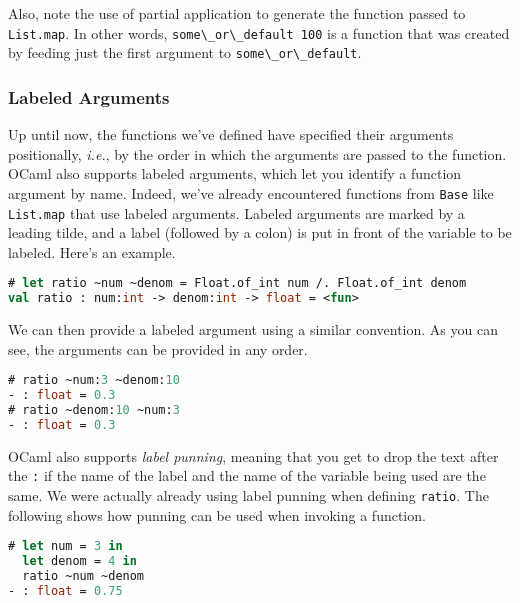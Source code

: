 Also, note the use of partial application to generate the function
passed to \passthrough{\lstinline!List.map!}. In other words,
\passthrough{\lstinline!some\_or\_default 100!} is a function that was
created by feeding just the first argument to
\passthrough{\lstinline!some\_or\_default!}.

\hypertarget{labeled-arguments}{%
\subsubsection{Labeled Arguments}\label{labeled-arguments}}

Up until now, the functions we've defined have specified their arguments
positionally, \emph{i.e.}, by the order in which the arguments are
passed to the function. OCaml also supports labeled arguments, which let
you identify a function argument by name. Indeed, we've already
encountered functions from \passthrough{\lstinline!Base!} like
\passthrough{\lstinline!List.map!} that use labeled arguments. Labeled
arguments are marked by a leading tilde, and a label (followed by a
colon) is put in front of the variable to be labeled. Here's an
example.

\begin{lstlisting}[language=Caml]
# let ratio ~num ~denom = Float.of_int num /. Float.of_int denom
val ratio : num:int -> denom:int -> float = <fun>
\end{lstlisting}

We can then provide a labeled argument using a similar convention. As
you can see, the arguments can be provided in any order.

\begin{lstlisting}[language=Caml]
# ratio ~num:3 ~denom:10
- : float = 0.3
# ratio ~denom:10 ~num:3
- : float = 0.3
\end{lstlisting}

OCaml also supports \emph{label punning}, meaning that you get to drop
the text after the \passthrough{\lstinline!:!} if the name of the label
and the name of the variable being used are the same. We were actually
already using label punning when defining
\passthrough{\lstinline!ratio!}. The following shows how punning can be
used when invoking a function.

\begin{lstlisting}[language=Caml]
# let num = 3 in
  let denom = 4 in
  ratio ~num ~denom
- : float = 0.75
\end{lstlisting}

